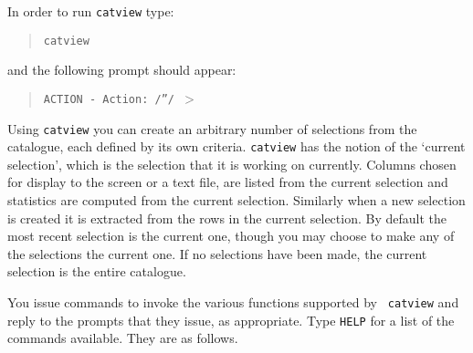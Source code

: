 \documentclass[twoside,11pt]{article}
\renewcommand{\_}{\texttt{\symbol{95}}}
\begin{document}
In order to run {\tt catview} type:

\begin{verse}
{\tt catview}
\end{verse}

and the following prompt should appear:

\begin{verse}
{\tt ACTION - Action: /''/ $>$}
\end{verse}

Using {\tt catview} you can create an arbitrary number of selections from
the catalogue, each defined by its own criteria. {\tt catview} has the
notion of the `current selection', which is the selection that it is
working on currently.  Columns chosen for display to the screen or a
text file, are listed from the current selection and statistics are
computed from the current selection.  Similarly when a new selection is
created it is extracted from the rows in the current selection.  By default
the most recent selection is the current one, though you may choose to make
any of the selections the current one.  If no selections have been made, the
current selection is the entire catalogue.

You issue commands to invoke the various functions supported by {\tt
catview} and reply to the prompts that they issue, as appropriate.
Type {\tt HELP} for a list of the commands available.  They are as
follows.
\end{document}
